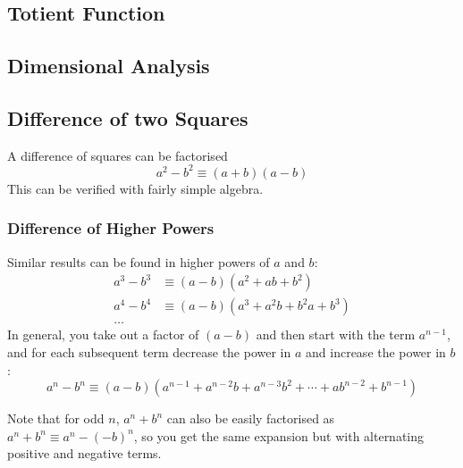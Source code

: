 \documentclass[fleqn,a4paper,11pt]{article}
\begin{document}
    \subsection{Totient Function} \label{sec_totient}

    \subsection{Dimensional Analysis}

    \subsection{Difference of two Squares}

    A difference of squares can be factorised
    \begin{equation}
    a^2 - b^2 \equiv (a + b)(a - b)
    \end{equation}
    This can be verified with fairly simple
    algebra.

    \subsubsection{Difference of Higher Powers}


    Similar results can be found in higher powers of \(a\) and \(b\):
    \begin{align*}
    a^3 - b^3 &\equiv (a - b)(a^2 + ab + b^2) \\
    a^4 - b^4 &\equiv (a - b)(a^3 + a^2b + b^2a + b^3) \\
    \dots
    \end{align*}
    In general, you take out a factor of \((a - b)\) and then start with the
    term \(a^{n - 1}\), and for each subsequent term decrease the power in \(a\)
    and increase the power in \(b\):
    \begin{equation}
    a^n - b^n \equiv (a - b)(a^{n - 1} + a^{n - 2}b + a^{n - 3}b^2 + \dotsb +
                             ab^{n - 2} + b^{n - 1})
    \end{equation}

    Note that for odd \(n\), \(a^n + b^n\) can also be easily factorised as
    \(a^n + b^n \equiv a^n - (-b)^n\), so you get the same expansion but with
    alternating positive and negative terms.

\end{document}
